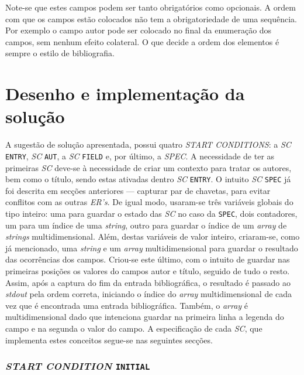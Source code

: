 Note-se que estes campos podem ser tanto obrigatórios como opcionais.
A ordem com que os campos estão colocados não tem a obrigatoriedade de uma
sequência. Por exemplo o campo autor pode ser colocado no final da enumeração
dos campos, sem nenhum efeito colateral. O que decide a ordem dos elementos
é sempre o estilo de bibliografia.


\section{Desenho e implementação da solução}
\label{sec:des:b2}

A sugestão de solução apresentada, possui quatro \emph{START CONDITIONS}:
a \emph{SC} \texttt{ENTRY}, \emph{SC} \texttt{AUT}, a \emph{SC} \texttt{FIELD}
e, por último, a \emph{SPEC}. A necessidade de ter as primeiras \emph{SC}
deve-se à necessidade de criar um contexto para tratar os autores, bem como
o título, sendo estas ativadas dentro \emph{SC} \texttt{ENTRY}. O intuito
\emph{SC} \texttt{SPEC} já foi descrita em secções anteriores --- capturar par
de chavetas, para evitar conflitos com as outras \emph{ER's}. De igual modo,
usaram-se três variáveis globais do tipo inteiro: uma para guardar o estado das
\emph{SC} no caso da \texttt{SPEC}, dois contadores, um para um índice de uma
\emph{string}, outro para guardar o índice de um \emph{array} de \emph{strings}
multidimensional. Além, destas variáveis de valor inteiro, criaram-se, como já
mencionado, uma \emph{string} e um \emph{array} multidimensional para guardar
o resultado das ocorrências dos campos. Criou-se este último, com o intuito de
guardar nas primeiras posições os valores do campos autor e título, seguido de
tudo o resto. Assim, após a captura do fim da entrada bibliográfica, o resultado
é passado ao \emph{stdout} pela ordem correta, iniciando o índice do
\emph{array} multidimensional de cada vez que é encontrada uma entrada
bibliográfica. Também, o \emph{array} é multidimensional dado que intenciona
guardar na primeira linha a legenda do campo e na segunda o valor do campo.
A especificação de cada \emph{SC}, que implementa estes conceitos segue-se nas
seguintes secções.


\subsubsection{\emph{START CONDITION} \texttt{INITIAL}}

